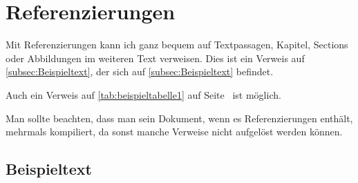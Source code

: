 \section{Referenzierungen}
Mit Referenzierungen kann ich ganz bequem auf Textpassagen, Kapitel, Sections oder Abbildungen im weiteren Text verweisen.
Dies ist ein Verweis auf \autoref{subsec:Beispieltext}, der sich auf \autoref{subsec:Beispieltext} befindet.

Auch ein Verweis auf \autoref{tab:beispieltabelle1} auf Seite~\pageref{tab:beispieltabelle1} ist möglich.

Man sollte beachten, dass man sein Dokument, wenn es Referenzierungen enthält, mehrmals kompiliert, da sonst manche
Verweise nicht aufgelöst werden können.


\subsection{Beispieltext}\label{subsec:Beispieltext}
\blindtext
